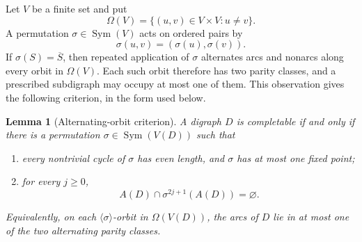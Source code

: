 \documentclass[11pt,reqno]{amsart}
\newtheorem{lemma}[theorem]{Lemma}
\theoremstyle{definition}
\newcommand{\Sym}{\operatorname{Sym}}
\begin{document}
Let \(V\) be a finite set and put
\[
\Omega(V)=\{(u,v)\in V\times V:u\ne v\}.
\]
A permutation \(\sigma\in\Sym(V)\) acts on ordered pairs by
\[
\sigma(u,v)=(\sigma(u),\sigma(v)).
\]
If \(\sigma(S)=\overline S\), then repeated application of \(\sigma\) alternates arcs and nonarcs along every orbit in \(\Omega(V)\). Each such orbit therefore has two parity classes, and a prescribed subdigraph may occupy at most one of them. This observation gives the following criterion, in the form used below.

\begin{lemma}[Alternating-orbit criterion]\label{lem:criterion}
A digraph \(D\) is completable if and only if there is a permutation \(\sigma\in\Sym(V(D))\) such that
\begin{enumerate}
\item every nontrivial cycle of \(\sigma\) has even length, and \(\sigma\) has at most one fixed point;
\item for every \(j\ge0\),
\begin{equation}\label{eq:odd-disjoint}
A(D)\cap \sigma^{2j+1}(A(D))=\varnothing.
\end{equation}
\end{enumerate}
Equivalently, on each \(\langle\sigma\rangle\)-orbit in \(\Omega(V(D))\), the arcs of \(D\) lie in at most one of the two alternating parity classes.
\end{lemma}
\end{document}
